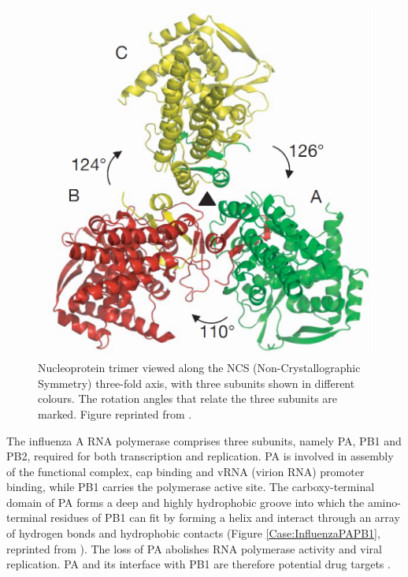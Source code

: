 \begin{figure}
\centering
\includegraphics[width=\linewidth]{Case/InfluenzaNucleoprotein.png}
\caption{Nucleoprotein trimer viewed along the NCS (Non-Crystallographic Symmetry) three-fold axis, with three subunits shown in different colours. The rotation angles that relate the three subunits are marked. Figure reprinted from \citep{1140}.}
\label{Case:InfluenzaNucleoprotein}
\end{figure}

The influenza A RNA polymerase comprises three subunits, namely PA, PB1 and PB2, required for both transcription and replication. PA is involved in assembly of the functional complex, cap binding and vRNA (virion RNA) promoter binding, while PB1 carries the polymerase active site. The carboxy-terminal domain of PA forms a deep and highly hydrophobic groove into which the amino-terminal residues of PB1 can fit by forming a helix and interact through an array of hydrogen bonds and hydrophobic contacts \citep{1141} (Figure \ref{Case:InfluenzaPAPB1}, reprinted from \citep{1141}). The loss of PA abolishes RNA polymerase activity and viral replication. PA and its interface with PB1 are therefore potential drug targets \citep{1141}.


